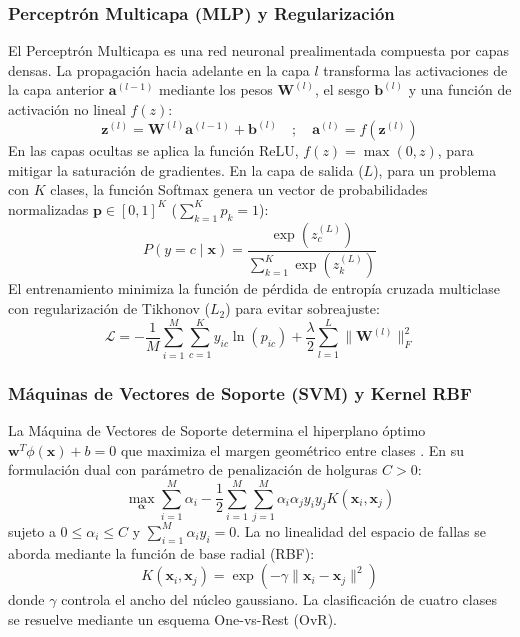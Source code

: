 \documentclass[conference]{IEEEtran}
\begin{document}
\subsubsection{Perceptrón Multicapa (MLP) y Regularización}
El Perceptrón Multicapa es una red neuronal prealimentada compuesta por capas densas. La propagación hacia adelante en la capa $l$ transforma las activaciones de la capa anterior $\mathbf{a}^{(l-1)}$ mediante los pesos $\mathbf{W}^{(l)}$, el sesgo $\mathbf{b}^{(l)}$ y una función de activación no lineal $f(z)$:
\begin{equation}
    \mathbf{z}^{(l)} = \mathbf{W}^{(l)} \mathbf{a}^{(l-1)} + \mathbf{b}^{(l)} \quad ; \quad \mathbf{a}^{(l)} = f(\mathbf{z}^{(l)})
    \label{eq:mlp_forward}
\end{equation}
En las capas ocultas se aplica la función ReLU, $f(z) = \max(0, z)$, para mitigar la saturación de gradientes. En la capa de salida ($L$), para un problema con $K$ clases, la función Softmax genera un vector de probabilidades normalizadas $\mathbf{p} \in [0, 1]^K$ ($\sum_{k=1}^K p_k = 1$):
\begin{equation}
    P(y = c \mid \mathbf{x}) = \frac{\exp(z_c^{(L)})}{\sum_{k=1}^K \exp(z_k^{(L)})}
    \label{eq:softmax_teoria}
\end{equation}
El entrenamiento minimiza la función de pérdida de entropía cruzada multiclase con regularización de Tikhonov ($L_2$) para evitar sobreajuste:
\begin{equation}
    \mathcal{L} = -\frac{1}{M}\sum_{i=1}^M \sum_{c=1}^K y_{ic} \ln(p_{ic}) + \frac{\lambda}{2}\sum_{l=1}^L \|\mathbf{W}^{(l)}\|_F^2
    \label{eq:loss_cross_entropy}
\end{equation}

\subsubsection{Máquinas de Vectores de Soporte (SVM) y Kernel RBF}
La Máquina de Vectores de Soporte determina el hiperplano óptimo $\mathbf{w}^T \phi(\mathbf{x}) + b = 0$ que maximiza el margen geométrico entre clases \cite{gangsar2020}. En su formulación dual con parámetro de penalización de holguras $C > 0$:
\begin{equation}
    \max_{\boldsymbol{\alpha}} \sum_{i=1}^M \alpha_i - \frac{1}{2}\sum_{i=1}^M \sum_{j=1}^M \alpha_i \alpha_j y_i y_j K(\mathbf{x}_i, \mathbf{x}_j)
    \label{eq:svm_dual}
\end{equation}
sujeto a $0 \le \alpha_i \le C$ y $\sum_{i=1}^M \alpha_i y_i = 0$. La no linealidad del espacio de fallas se aborda mediante la función de base radial (RBF):
\begin{equation}
    K(\mathbf{x}_i, \mathbf{x}_j) = \exp\left(-\gamma \|\mathbf{x}_i - \mathbf{x}_j\|^2\right)
    \label{eq:rbf_kernel}
\end{equation}
donde $\gamma$ controla el ancho del núcleo gaussiano. La clasificación de cuatro clases se resuelve mediante un esquema One-vs-Rest (OvR).
\end{document}
